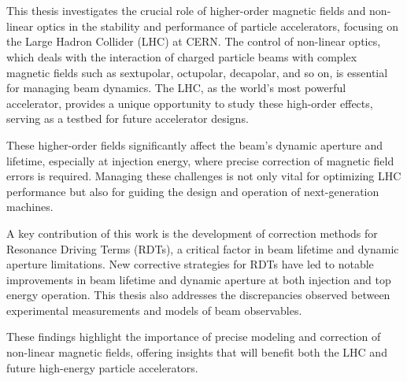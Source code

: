 \chapter{}


{
\fontsize{\fontsizeabstract}{\fontskipabstract}\selectfont

This thesis investigates the crucial role of higher-order magnetic fields and non-linear optics in
the stability and performance of particle accelerators, focusing on the Large Hadron Collider (LHC)
at CERN. The control of non-linear optics, which deals with the interaction of charged particle 
beams with complex magnetic fields such as sextupolar, octupolar, decapolar, and so on, is essential
for managing beam dynamics. The LHC, as the world's most powerful accelerator, provides a unique
opportunity to study these high-order effects, serving as a testbed for future accelerator designs.

These higher-order fields significantly affect the beam's dynamic aperture and lifetime, especially
at injection energy, where precise correction of magnetic field errors is required. Managing these
challenges is not only vital for optimizing LHC performance but also for guiding the design and
operation of next-generation machines.

A key contribution of this work is the development of correction methods for Resonance Driving Terms
(RDTs), a critical factor in beam lifetime and dynamic aperture limitations. New corrective
strategies for RDTs have led to notable improvements in beam lifetime and dynamic aperture at both
injection and top energy operation. This thesis also addresses the discrepancies observed between
experimental measurements and models of beam observables.

These findings highlight the importance of precise modeling and correction of non-linear magnetic
fields, offering insights that will benefit both the LHC and future high-energy particle
accelerators.
}